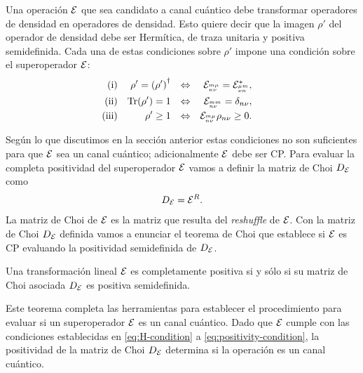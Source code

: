 Una operación $\mathcal{E}$ que sea candidato a canal cuántico debe transformar 
operadores de densidad en operadores de densidad. Esto quiere decir que
la imagen $\rho'$ del operador de densidad debe ser Hermítica, 
de traza unitaria y positiva semidefinida. 
Cada una de estas condiciones sobre $\rho'$ impone una condición 
sobre el superoperador $\mathcal{E}$:
\begin{align}
\text{(i)}&& \rho'=\qty(\rho')^{\dagger}&&\Leftrightarrow
    && \mathcal{E}_{{}^{m\mu}_{n\nu}}=\mathcal{E}_{{}^{\mu m}_{\nu n}}^*,&&
    \label{eq:H-condition}\\
\text{(ii)}&&\Tr(\rho')=1
    &&\Leftrightarrow&&  \mathcal{E}_{{}^{mm}_{n\nu}}=\delta_{n\nu},\\     
\text{(iii)}&&\rho'\geq1
    &&\Leftrightarrow&&  \mathcal{E}_{{}^{m\mu}_{n\nu}}\rho_{n\nu}\geq0.
    \label{eq:positivity-condition}
\end{align}



Según lo que discutimos en la sección anterior estas condiciones
no son suficientes para que $\mathcal{E}$ sea un canal cuántico; adicionalmente 
$\mathcal{E}$ debe ser CP. Para evaluar la completa positividad del superoperador $\mathcal{E}$ 
vamos a definir la matriz de Choi $D_{\mathcal{E}}$ como 
\cite{bengtsson_zyczkowski_2017}
\begin{align}
D_{\mathcal{E}}=\mathcal{E}^{R}.
\end{align}
La matriz de Choi de $\mathcal{E}$ es la matriz que resulta del \textit{reshuffle}
de $\mathcal{E}$. Con la matriz de Choi $D_{\mathcal{E}}$ definida vamos a enunciar 
el teorema de Choi \cite{bengtsson_zyczkowski_2017} que
establece si $\mathcal{E}$ es CP evaluando la positividad semidefinida de $D_{\mathcal{E}}$.
\begin{teorema}
Una transformación lineal $\mathcal{E}$ es completamente positiva si y sólo si 
su matriz de Choi asociada $D_{\mathcal{E}}$ es positiva semidefinida.
\end{teorema}
Este teorema completa las herramientas para establecer el procedimiento 
para evaluar si un superoperador $\mathcal{E}$ es un canal cuántico. 
Dado que $\mathcal{E}$ cumple con las condiciones establecidas en
\eqref{eq:H-condition} a \eqref{eq:positivity-condition}, la positividad
de la matriz de Choi $D_{\mathcal{E}}$ determina si la operación es un canal cuántico.


